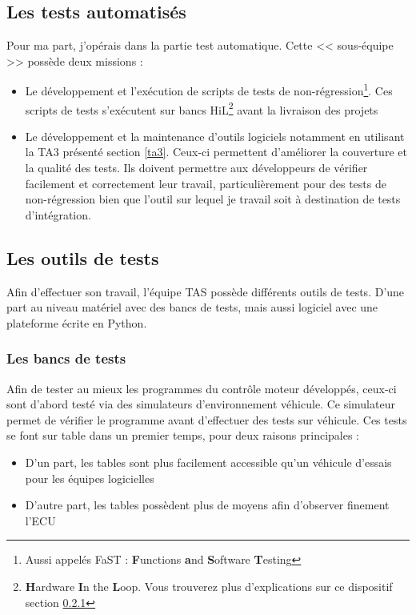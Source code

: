  		\subsection{Les tests automatisés}

 		
 		Pour ma part, j'opérais dans la partie test automatique. Cette << sous-équipe >> possède deux missions : 
 		\begin{itemize}
 			\item Le développement et l'exécution de scripts de tests de non-régression\footnote{Aussi appelés FaST : \textbf{F}unctions \textbf{a}nd \textbf{S}oftware \textbf{T}esting}. Ces scripts de tests s'exécutent sur bancs HiL\footnote{\textbf{H}ardware \textbf{I}n the \textbf{L}oop. Vous trouverez plus d'explications sur ce dispositif section \ref{wb}} avant la livraison des projets
 			\item Le développement et la maintenance d'outils logiciels notamment en utilisant la TA3 présenté section \ref{ta3}. Ceux-ci permettent d'améliorer la couverture et la qualité des tests. Ils doivent permettre aux développeurs de vérifier facilement et correctement leur travail, particulièrement pour des tests de non-régression bien que l'outil sur lequel je travail soit à destination de tests d'intégration.
 		\end{itemize}
	\subsection{Les outils de tests}
	Afin d'effectuer son travail, l'équipe TAS possède différents outils de tests. D'une part au niveau matériel avec des bancs de tests, mais aussi logiciel avec une plateforme écrite en Python.
	
		\subsubsection{Les bancs de tests}\label{wb}
		Afin de tester au mieux les programmes du contrôle moteur développés, ceux-ci sont d'abord testé via des simulateurs d'environnement véhicule. Ce simulateur permet de vérifier le programme avant d'effectuer des tests sur véhicule. Ces tests se font sur table dans un premier temps, pour deux raisons principales : 
		\begin{itemize}
			\item D'un part, les tables sont plus facilement accessible qu'un véhicule d'essais pour les équipes logicielles
			\item D'autre part, les tables possèdent plus de moyens afin d'observer finement l'ECU
		\end{itemize}
		
